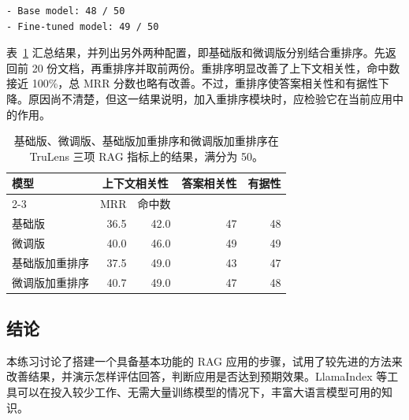 \noindent\begin{minipage}{\linewidth}
\begin{lstlisting}[caption={有据性分数},label={lst:ch07-grounding-scores}]
- Base model: 48 / 50
- Fine-tuned model: 49 / 50
\end{lstlisting}
\end{minipage}\par

表~\ref{tab:ch07-tutorial-results} 汇总结果，并列出另外两种配置，即基础版和微调版分别结合重排序。先返回前 20 份文档，再重排序并取前两份。重排序明显改善了上下文相关性，命中数接近 100\%，总 MRR 分数也略有改善。不过，重排序使答案相关性和有据性下降。原因尚不清楚，但这一结果说明，加入重排序模块时，应检验它在当前应用中的作用。

\begin{table}[!htbp]
\centering
\caption{基础版、微调版、基础版加重排序和微调版加重排序在 TruLens 三项 RAG 指标上的结果，满分为 50。}
\label{tab:ch07-tutorial-results}
\small
\setlength{\tabcolsep}{3pt}
\begin{tabular}{@{}lrrrr@{}}
\toprule
模型 & \multicolumn{2}{c}{上下文相关性} & 答案相关性 & 有据性\\
\cmidrule(lr){2-3}
 & MRR & 命中数 & &\\
\midrule
基础版 & 36.5 & 42.0 & 47 & 48\\
微调版 & 40.0 & 46.0 & 49 & 49\\
基础版加重排序 & 37.5 & 49.0 & 43 & 47\\
微调版加重排序 & 40.7 & 49.0 & 47 & 48\\
\bottomrule
\end{tabular}
\end{table}

\subsection{结论}
本练习讨论了搭建一个具备基本功能的 RAG 应用的步骤，试用了较先进的方法来改善结果，并演示怎样评估回答，判断应用是否达到预期效果。LlamaIndex 等工具可以在投入较少工作、无需大量训练模型的情况下，丰富大语言模型可用的知识。

